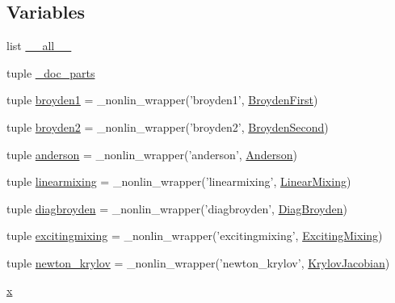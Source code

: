 \subsection*{Variables}
\begin{DoxyCompactItemize}
\item 
list \hyperlink{namespacescipy_1_1optimize_1_1nonlin_a980d070a644fbf263ba8d74362a4c3c1}{\+\_\+\+\_\+all\+\_\+\+\_\+}
\item 
tuple \hyperlink{namespacescipy_1_1optimize_1_1nonlin_a28b5c05f917e98b2c130627e965c9ae3}{\+\_\+doc\+\_\+parts}
\item 
tuple \hyperlink{namespacescipy_1_1optimize_1_1nonlin_ae1d6cb5ed400989a1af3a86af051b0d1}{broyden1} = \+\_\+nonlin\+\_\+wrapper('broyden1', \hyperlink{classscipy_1_1optimize_1_1nonlin_1_1BroydenFirst}{Broyden\+First})
\item 
tuple \hyperlink{namespacescipy_1_1optimize_1_1nonlin_a1c6f791ed5ec1f8118b76ac024fd8125}{broyden2} = \+\_\+nonlin\+\_\+wrapper('broyden2', \hyperlink{classscipy_1_1optimize_1_1nonlin_1_1BroydenSecond}{Broyden\+Second})
\item 
tuple \hyperlink{namespacescipy_1_1optimize_1_1nonlin_a8aeda5bbe483199905b66de9ef77c14d}{anderson} = \+\_\+nonlin\+\_\+wrapper('anderson', \hyperlink{classscipy_1_1optimize_1_1nonlin_1_1Anderson}{Anderson})
\item 
tuple \hyperlink{namespacescipy_1_1optimize_1_1nonlin_ad51694d96aecd2e4264d995259d40631}{linearmixing} = \+\_\+nonlin\+\_\+wrapper('linearmixing', \hyperlink{classscipy_1_1optimize_1_1nonlin_1_1LinearMixing}{Linear\+Mixing})
\item 
tuple \hyperlink{namespacescipy_1_1optimize_1_1nonlin_af32ef0225ac1c4495ff2a20fca837677}{diagbroyden} = \+\_\+nonlin\+\_\+wrapper('diagbroyden', \hyperlink{classscipy_1_1optimize_1_1nonlin_1_1DiagBroyden}{Diag\+Broyden})
\item 
tuple \hyperlink{namespacescipy_1_1optimize_1_1nonlin_a6ca7d71e1146d29c858a2b10bbd0d251}{excitingmixing} = \+\_\+nonlin\+\_\+wrapper('excitingmixing', \hyperlink{classscipy_1_1optimize_1_1nonlin_1_1ExcitingMixing}{Exciting\+Mixing})
\item 
tuple \hyperlink{namespacescipy_1_1optimize_1_1nonlin_a755c2bc3bfa3f62b3d94d5c96f2d4f76}{newton\+\_\+krylov} = \+\_\+nonlin\+\_\+wrapper('newton\+\_\+krylov', \hyperlink{classscipy_1_1optimize_1_1nonlin_1_1KrylovJacobian}{Krylov\+Jacobian})
\item 
\hyperlink{namespacescipy_1_1optimize_1_1nonlin_a62a0f3035bdcf81487f3212938c9b377}{x}
\end{DoxyCompactItemize}


